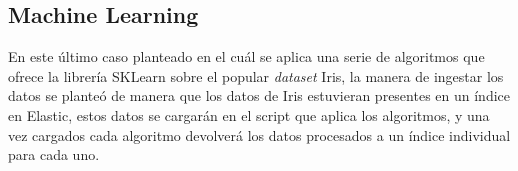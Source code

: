 \paragraph{}
\paragraph{}
\paragraph{}
\paragraph{}
\paragraph{}
\paragraph{}
\paragraph{}
\paragraph{}
\paragraph{}
\paragraph{}
\paragraph{}


\subsection{Machine Learning}

En este último caso planteado en el cuál se aplica una serie de algoritmos que ofrece la librería SKLearn sobre el popular \textit{dataset} Iris, la manera de ingestar los datos se planteó de manera que los datos de Iris estuvieran presentes en un índice en Elastic, estos datos se cargarán en el script que aplica los algoritmos, y una vez cargados cada algoritmo devolverá los datos procesados a un índice individual para cada uno.

